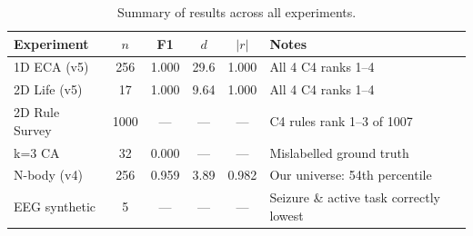\documentclass[12pt,a4paper]{article}
\begin{document}
\begin{table}[h]
\centering
\caption{Summary of results across all experiments.}
\begin{tabular}{lccccl}
\toprule
Experiment & $n$ & F1 & $d$ & $|r|$ & Notes \\
\midrule
1D ECA (v5)      & 256  & 1.000 & 29.6 & 1.000
  & All 4 C4 ranks 1--4 \\
2D Life (v5)     & 17   & 1.000 & 9.64 & 1.000
  & All 4 C4 ranks 1--4 \\
2D Rule Survey   & 1000 & ---   & ---  & ---
  & C4 rules rank 1--3 of 1007 \\
k=3 CA           & 32   & 0.000 & ---  & ---
  & Mislabelled ground truth \\
N-body (v4)      & 256  & 0.959 & 3.89 & 0.982
  & Our universe: 54th percentile \\
EEG synthetic    & 5    & ---   & ---  & ---
  & Seizure \& active task correctly lowest \\
\bottomrule
\end{tabular}
\end{table}
\end{document}
